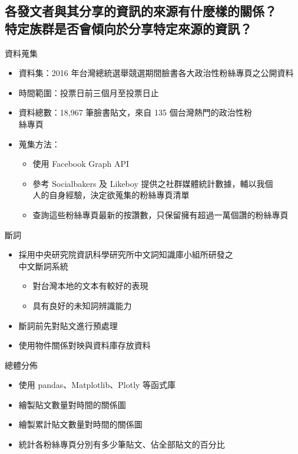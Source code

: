\documentclass{beamer}
\begin{document}
\begin{CJK}{UTF8}{bkai}
\section{
各發文者與其分享的資訊的來源有什麼樣的關係？\texorpdfstring{\protect\\}{}
\hspace{.35em}特定族群是否會傾向於分享特定來源的資訊？
}

\begin{frame}{資料蒐集}
\begin{itemize}
\item 資料集：2016 年台灣總統選舉競選期間臉書各大政治性粉絲專頁之公開資料
\item 時間範圍：投票日前三個月至投票日止
\item 資料總數：18,967 筆臉書貼文，來自 135 個台灣熱門的政治性粉\\絲專頁
\item 蒐集方法：
  \begin{itemize}
  \item 使用 Facebook Graph API
  \item 參考 Socialbakers 及 Likeboy 提供之社群媒體統計數據，輔以我個\\人的自身經驗，決定欲蒐集的粉絲專頁清單
  \item 查詢這些粉絲專頁最新的按讚數，只保留擁有超過一萬個讚的粉絲專頁
  \end{itemize}
\end{itemize}
\end{frame}

\begin{frame}{斷詞}
\begin{itemize}
\item 採用中央研究院資訊科學研究所中文詞知識庫小組所研發之\\中文斷詞系統
  \begin{itemize}
  \item 對台灣本地的文本有較好的表現
  \item 具有良好的未知詞辨識能力
  \end{itemize}
\item 斷詞前先對貼文進行預處理
\item 使用物件關係對映與資料庫存放資料
\end{itemize}
\end{frame}

\begin{frame}{總體分佈}
\begin{itemize}
\item 使用 pandas、Matplotlib、Plotly 等函式庫
\item 繪製貼文數量對時間的關係圖
\item 繪製累計貼文數量對時間的關係圖
\item 統計各粉絲專頁分別有多少筆貼文、佔全部貼文的百分比
\end{itemize}
\end{frame}


\end{CJK}
\end{document}
